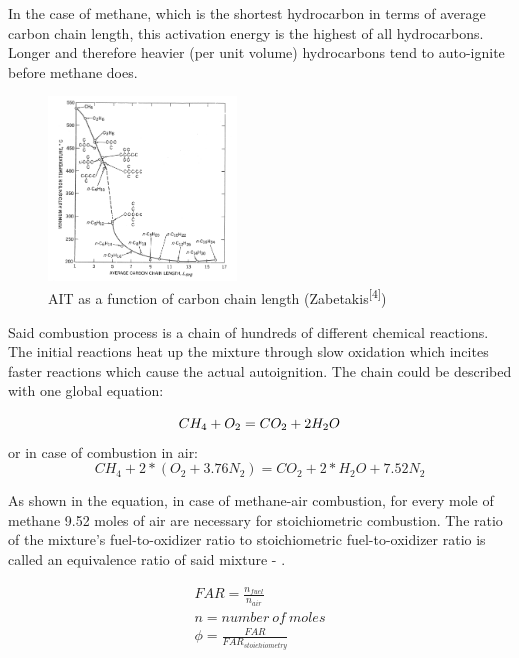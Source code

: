 \documentclass[a4paper]{article}[11pt]
\begin{document}
    In the case of methane, which is the shortest hydrocarbon in terms of average carbon chain length, this activation energy is the highest of all hydrocarbons. Longer and therefore heavier (per unit volume) hydrocarbons tend to auto-ignite before methane does.  \par
\begin{figure}[h]
\centering
\includegraphics[width=5cm]{zabetakis.PNG}
\caption{AIT as a function of carbon chain length (Zabetakis\textsuperscript{[4]})}
\end{figure}
    Said combustion process is a chain of hundreds of different chemical reactions. The initial reactions heat up the mixture through slow oxidation which incites faster reactions which cause the actual autoignition. The chain could be described with one global equation: \par
    
    \begin{equation*}
    	CH_4 + O_2 = CO_2 + 2 H_2O\\        
    \end{equation*}
    or in case of combustion in air:
    \begin{equation*}
    	CH_4 + 2*(O_2+3.76N_2) = CO_2 + 2*H_2O + 7.52 N_2 
     \end{equation*}
     
     As shown in the equation, in case of methane-air combustion, for every mole of methane 9.52 moles of air are necessary for stoichiometric combustion. The ratio of the mixture's fuel-to-oxidizer ratio to stoichiometric fuel-to-oxidizer ratio is called an equivalence ratio of said mixture - \textphi . \par 
     
     \begin{gather*}
    FAR = \frac{n_{fuel}}{n_{air}} \\
    n = number \ of \ moles \\
    \phi = \frac{FAR}{FAR_{stoichiometry}}
     \end{gather*}
     
\end{document}
